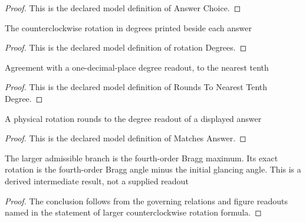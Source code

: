 \begin{proof}
  This is the declared model definition of Answer Choice.
\end{proof}
\begin{definition}
  \label{def:physics:phyx-mini-0079:phyxminiproblems-problemphyxmini0079-answerchoice-rotationdegrees}
  The counterclockwise rotation in degrees printed beside each answer
\end{definition}
\begin{proof}
  This is the declared model definition of rotation Degrees.
\end{proof}
\begin{definition}
  \label{def:physics:phyx-mini-0079:phyxminiproblems-problemphyxmini0079-roundstonearesttenthdegree}
  Agreement with a one-decimal-place degree readout, to the nearest tenth
\end{definition}
\begin{proof}
  This is the declared model definition of Rounds To Nearest Tenth Degree.
\end{proof}
\begin{definition}
  \label{def:physics:phyx-mini-0079:phyxminiproblems-problemphyxmini0079-matchesanswer}
  A physical rotation rounds to the degree readout of a displayed answer
\end{definition}
\begin{proof}
  This is the declared model definition of Matches Answer.
\end{proof}
\begin{lemma}
  \label{lem:physics:phyx-mini-0079:phyxminiproblems-problemphyxmini0079-larger-counterclockwise-rotation-formula}
  The larger admissible branch is the fourth-order Bragg maximum. Its exact rotation is the fourth-order Bragg angle minus the initial glancing angle. This is a derived intermediate result, not a supplied readout
\end{lemma}
\begin{proof}
  The conclusion follows from the governing relations and figure readouts named in the statement of larger counterclockwise rotation formula.
\end{proof}
